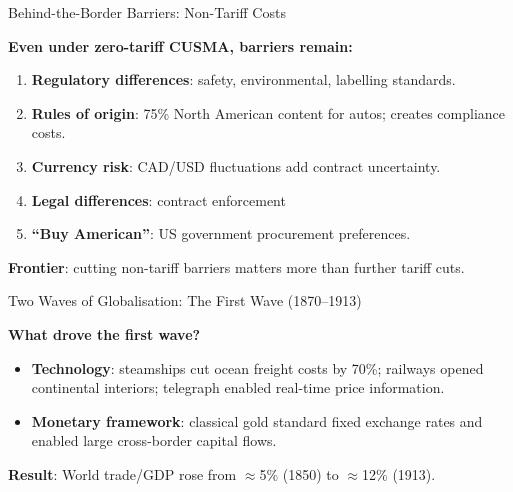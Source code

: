 \documentclass[aspectratio=169]{beamer}
\begin{document}
\begin{frame}{Behind-the-Border Barriers: Non-Tariff Costs}

\textbf{Even under zero-tariff CUSMA, barriers remain:}
\begin{enumerate}\small
  \item \textbf{Regulatory differences}: safety, environmental, labelling standards.
  \item \textbf{Rules of origin}: 75\% North American content for autos; creates compliance costs.
  \item \textbf{Currency risk}: CAD/USD fluctuations add contract uncertainty.
  \item \textbf{Legal differences}: contract enforcement
  \item \textbf{``Buy American''}: US government procurement preferences.
\end{enumerate}
\vspace{0.2em}
\textbf{Frontier}: cutting non-tariff barriers matters more than further tariff cuts.


\end{frame}


\begin{frame}{Two Waves of Globalisation: The First Wave (1870--1913)}

\textbf{What drove the first wave?}
\begin{itemize}
  \item \textbf{Technology}: steamships cut ocean freight costs by 70\%; railways opened continental interiors; telegraph enabled real-time price information.
  \item \textbf{Monetary framework}: classical gold standard fixed exchange rates and enabled large cross-border capital flows.

\end{itemize}
\vspace{0.2em}
\textbf{Result}: World trade/GDP rose from $\approx$5\% (1850) to $\approx$12\% (1913).

\end{frame}
\end{document}
